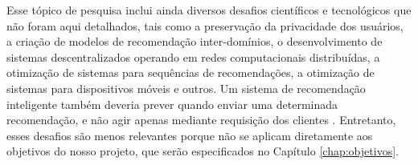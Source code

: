 Esse tópico de pesquisa inclui ainda diversos desafios científicos e tecnológicos que não foram aqui detalhados, tais como a preservação da privacidade dos usuários, a criação de modelos de recomendação inter-domínios, o desenvolvimento de sistemas descentralizados operando em redes computacionais distribuídas, a otimização de sistemas para sequências de recomendações, a otimização de sistemas para dispositivos móveis e outros. Um sistema de recomendação inteligente também deveria prever quando enviar uma determinada recomendação, e não agir apenas mediante requisição dos clientes \cite{lops2011content}. Entretanto, esses desafios são menos relevantes porque não se aplicam diretamente aos objetivos do nosso projeto, que serão especificados no Capítulo \ref{chap:objetivos}.

